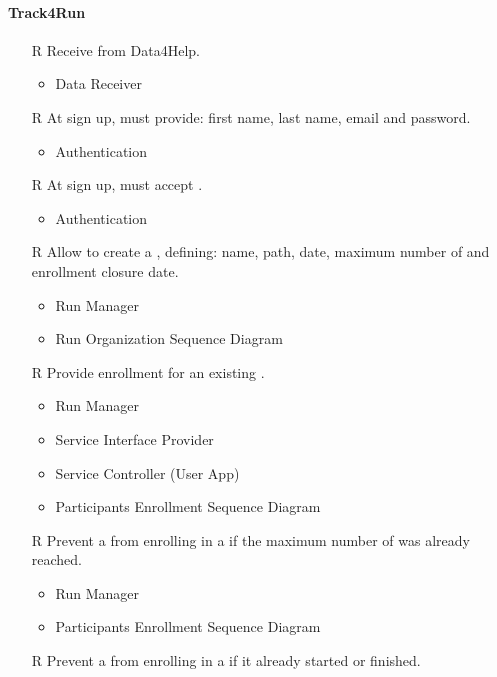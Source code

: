 \paragraph{Track4Run}
\begin{itemize}
	\item[R\subs{40}]Receive  from Data4Help.
	\begin{itemize}
		\item Data Receiver
	\end{itemize}
	\item[R\subs{41}]At sign up,  must provide: first name, last name, email and password.
	\begin{itemize}
		\item Authentication
	\end{itemize}
	\item[R\subs{42}]At sign up,  must accept .
	\begin{itemize}
		\item Authentication
	\end{itemize}
	\item[R\subs{43}]Allow  to create a , defining: name, path, date, maximum number of  and enrollment closure date.
	\begin{itemize}
		\item Run Manager
		\item Run Organization Sequence Diagram
	\end{itemize}
	\item[R\subs{44}]Provide  enrollment for an existing .
	\begin{itemize}
		\item Run Manager
		\item Service Interface Provider
		\item Service Controller (User App)
		\item Participants Enrollment Sequence Diagram
	\end{itemize}
	\item[R\subs{45}]Prevent a  from enrolling in a  if the maximum number of  was already reached.
	\begin{itemize}
		\item Run Manager
		\item Participants Enrollment Sequence Diagram
	\end{itemize}
	\item[R\subs{46}]Prevent a  from enrolling in a  if it already started or finished.

\end{itemize}
